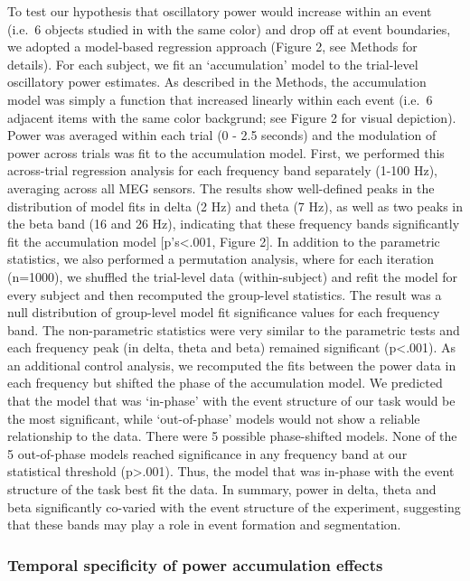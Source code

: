 To test our hypothesis that oscillatory power would increase within an
event (i.e.~6 objects studied in with the same color) and drop off at
event boundaries, we adopted a model-based regression approach (Figure
2, see Methods for details). For each subject, we fit an `accumulation'
model to the trial-level oscillatory power estimates. As described in
the Methods, the accumulation model was simply a function that increased
linearly within each event (i.e.~6 adjacent items with the same color
backgrund; see Figure 2 for visual depiction). Power was averaged within
each trial (0 - 2.5 seconds) and the modulation of power across trials
was fit to the accumulation model. First, we performed this across-trial
regression analysis for each frequency band separately (1-100 Hz),
averaging across all MEG sensors. The results show well-defined peaks in
the distribution of model fits in delta (2 Hz) and theta (7 Hz), as well
as two peaks in the beta band (16 and 26 Hz), indicating that these
frequency bands significantly fit the accumulation model
{[}p's\textless{}.001, Figure 2{]}. In addition to the parametric
statistics, we also performed a permutation analysis, where for each
iteration (n=1000), we shuffled the trial-level data (within-subject)
and refit the model for every subject and then recomputed the
group-level statistics. The result was a null distribution of
group-level model fit significance values for each frequency band. The
non-parametric statistics were very similar to the parametric tests and
each frequency peak (in delta, theta and beta) remained significant
(p\textless{}.001). As an additional control analysis, we recomputed the
fits between the power data in each frequency but shifted the phase of
the accumulation model. We predicted that the model that was `in-phase'
with the event structure of our task would be the most significant,
while `out-of-phase' models would not show a reliable relationship to
the data. There were 5 possible phase-shifted models. None of the 5
out-of-phase models reached significance in any frequency band at our
statistical threshold (p\textgreater{}.001). Thus, the model that was
in-phase with the event structure of the task best fit the data. In
summary, power in delta, theta and beta significantly co-varied with the
event structure of the experiment, suggesting that these bands may play
a role in event formation and segmentation.

\subsubsection{Temporal specificity of power accumulation
effects}\label{temporal-specificity-of-power-accumulation-effects}

